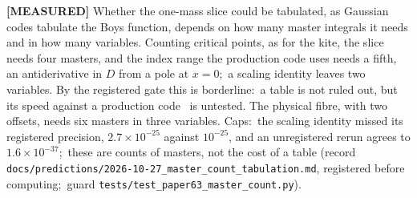 \documentclass[aps,pra,twocolumn,superscriptaddress,longbibliography]{revtex4-2}
\begin{document}
\textbf{[MEASURED]} Whether the one-mass slice could be tabulated, as Gaussian
codes tabulate the Boys function, depends on how many master integrals it
needs and in how many variables.  Counting critical points, as for the kite,
the slice needs four masters, and the index range the production code uses
needs a fifth, an antiderivative in $D$ from a pole at $x=0$;\ a scaling
identity leaves two variables.  By the registered gate this is borderline:\ a
table is not ruled out, but its speed against a production
code~\cite{chen2026fourier} is untested.  The physical fibre, with two
offsets, needs six masters in three variables.  Caps:\ the scaling identity
missed its registered precision, $2.7\times10^{-25}$ against $10^{-25}$, and
an unregistered rerun agrees to $1.6\times10^{-37}$;\ these are counts of
masters, not the cost of a table (record
\texttt{docs/predictions/2026-10-27\_master\_count\_tabulation.md}, registered
before computing;\ guard \texttt{tests/test\_paper63\_master\_count.py}).
\end{document}
